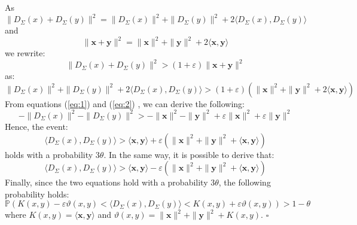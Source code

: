 \documentclass[twoside,11pt]{article}
\newenvironment{proof}{{\bf Proof:}}{$\square$ }
\def\vec#1{\mathbf{#1}}
\def\P{\mathbb{P}}
\def\dotprod#1#2{\langle#1,#2\rangle}
\def\df{\Upsilon}
\def\J{\vartheta}
\begin{document}
\begin{proof}
As 
$$
\|D_{\Sigma}(x)+D_{\Sigma}(y)\|^2 = \|D_{\Sigma}(x)\|^2 + \|D_{\Sigma}(y)\|^2 + 2 \dotprod{D_{\Sigma}(x)}{D_{\Sigma}(y)}
$$
and
$$
\|\vec{x}+\vec{y}\|^2  = \|\vec{x}\|^2 + \|\vec{y}\|^2 + 2 \dotprod{\vec{x}}{\vec{y}}
$$
we rewrite:
$$
\|D_{\Sigma}(x)+D_{\Sigma}(y)\|^2 > (1 + \varepsilon) \|\vec{x}+\vec{y}\|^2
$$
as:
$$
 \|D_{\Sigma}(x)\|^2 + \|D_{\Sigma}(y)\|^2 + 2 \dotprod{D_{\Sigma}(x)}{D_{\Sigma}(y)} > (1 + \varepsilon) (\|\vec{x}\|^2 + \|\vec{y}\|^2 + 2 \dotprod{\vec{x}}{\vec{y}})
$$
From equations (\ref{eq:1}) and (\ref{eq:2}) , we can derive the following:
$$
- \|D_{\Sigma}(x)\|^2 - \|D_{\Sigma}(y)\|^2 > -\|\vec{x}\|^2 -\|\vec{y}\|^2 +  \varepsilon\|\vec{x}\|^2 + \varepsilon\|\vec{y}\|^2 
$$
Hence, the event:
$$
 \dotprod{D_{\Sigma}(x)}{D_{\Sigma}(y)} >\dotprod{\vec{x}}{\vec{y}} + \varepsilon (\|\vec{x}\|^2 + \|\vec{y}\|^2 +  \dotprod{\vec{x}}{\vec{y}})
$$
holds with a probability $3\theta$.
In the same way, it is possible to derive that:
$$
 \dotprod{D_{\Sigma}(x)}{D_{\Sigma}(y)} >\dotprod{\vec{x}}{\vec{y}} - \varepsilon (\|\vec{x}\|^2 + \|\vec{y}\|^2 +  \dotprod{\vec{x}}{\vec{y}})
$$
Finally, since the two equations hold with a probability $3\theta$, the following probability holds:
$$
\P(K(x,y) - \varepsilon\J(x,y)<\dotprod{D_{\Sigma}(x)}{D_{\Sigma}(y)}<K(x,y) + \varepsilon \J(x,y) )> 1 - \theta
$$
where $K(x,y) = \dotprod{\vec{x}}{\vec{y}}$ and 
$\J(x,y) = \|\vec{x}\|^2 + \|\vec{y}\|^2 +  K(x,y)$.
\end{proof}
\end{document}
